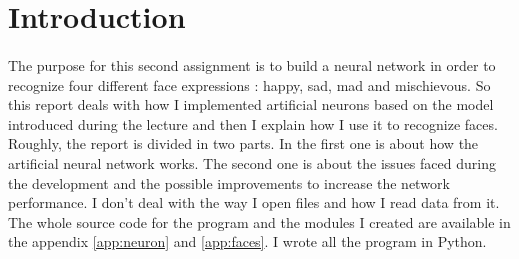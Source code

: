 \section*{Introduction}

    \paragraph{}{
        The purpose for this second assignment is to build a neural network in
     order to recognize four different face expressions : happy, sad, mad and 
     mischievous. So this report deals with how I implemented artificial neurons
     based on the model introduced during the lecture and then I explain how I 
     use it to recognize faces. Roughly, the report is divided in two parts. 
     In the first one is about how the artificial neural network works. The
     second one is about the issues faced during the development and the 
     possible improvements to increase the network performance. \newline
     I don't deal with the way I open files and how I read data from it. The 
     whole source code for the program and the modules I created are available 
     in the appendix \ref{app:neuron} and \ref{app:faces}. I wrote all the 
     program in Python.
    }
